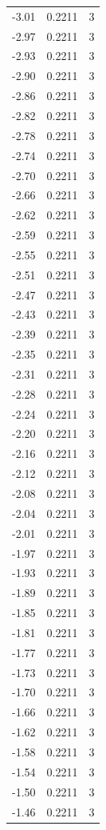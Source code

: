 \begin{longtable}{lrr}
  -3.01 & 0.2211 & 3 \\
  -2.97 & 0.2211 & 3 \\
  -2.93 & 0.2211 & 3 \\
  -2.90 & 0.2211 & 3 \\
  -2.86 & 0.2211 & 3 \\
  -2.82 & 0.2211 & 3 \\
  -2.78 & 0.2211 & 3 \\
  -2.74 & 0.2211 & 3 \\
  -2.70 & 0.2211 & 3 \\
  -2.66 & 0.2211 & 3 \\
  -2.62 & 0.2211 & 3 \\
  -2.59 & 0.2211 & 3 \\
  -2.55 & 0.2211 & 3 \\
  -2.51 & 0.2211 & 3 \\
  -2.47 & 0.2211 & 3 \\
  -2.43 & 0.2211 & 3 \\
  -2.39 & 0.2211 & 3 \\
  -2.35 & 0.2211 & 3 \\
  -2.31 & 0.2211 & 3 \\
  -2.28 & 0.2211 & 3 \\
  -2.24 & 0.2211 & 3 \\
  -2.20 & 0.2211 & 3 \\
  -2.16 & 0.2211 & 3 \\
  -2.12 & 0.2211 & 3 \\
  -2.08 & 0.2211 & 3 \\
  -2.04 & 0.2211 & 3 \\
  -2.01 & 0.2211 & 3 \\
  -1.97 & 0.2211 & 3 \\
  -1.93 & 0.2211 & 3 \\
  -1.89 & 0.2211 & 3 \\
  -1.85 & 0.2211 & 3 \\
  -1.81 & 0.2211 & 3 \\
  -1.77 & 0.2211 & 3 \\
  -1.73 & 0.2211 & 3 \\
  -1.70 & 0.2211 & 3 \\
  -1.66 & 0.2211 & 3 \\
  -1.62 & 0.2211 & 3 \\
  -1.58 & 0.2211 & 3 \\
  -1.54 & 0.2211 & 3 \\
  -1.50 & 0.2211 & 3 \\
  -1.46 & 0.2211 & 3 \\

\end{longtable}

